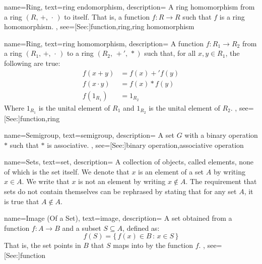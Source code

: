 {
    name={Ring},
    text={ring endomorphism},
    description={
        A ring homomorphism from a ring $(R,\,+,\,\cdot\,)$ to itself.
        That is, a function $f:R\rightarrow{R}$ such that $f$ is a
        ring homomorphism.
    },
    see=[See:]{function,ring,ring homomorphism}
}

{
    name={Ring},
    text={ring homomorphism},
    description={
        A function $f:R_{1}\rightarrow{R}_{2}$ from a ring
        $(R_{1},\,+,\,\cdot\,)$ to a ring $(R_{2},\,+',\,*)$ such that,
        for all $x,y\in{R}_{1}$, the following are true:
        {%
            \begin{align*}
                f(x+y)&=f(x)+'f(y)\\
                f(x\cdot{y})&=f(x)*f(y)\\
                f(1_{R_{1}})&=1_{R_{2}}
            \end{align*}
        }%
        Where $1_{R_{1}}$ is the unital element of $R_{1}$ and
        $1_{R_{2}}$ is the unital element of $R_{2}$.
    },
    see=[See:]{function,ring}
}

{
    name={Semigroup},
    text={semigroup},
    description={
        A set $G$ with a binary operation $*$ such that $*$ is associative.
    },
    see=[See:]{binary operation,associative operation}
}

{
    name={Sets},
    text={set},
    description={
        A collection of objects, called elements, none of which is the set
        itself. We denote that $x$ is an element of a set $A$ by writing
        $x\in{A}$. We write that $x$ is not an element by writing
        $x\notin{A}$. The requirement that sets do not contain themselves can
        be rephrased by stating that for any set $A$, it is true that
        $A\notin{A}$.
    }
}

{
    name={Image (Of a Set)},
    text={image},
    description={
        A set obtained from a function $f:A\rightarrow{B}$
        and a subset $S\subseteq{A}$, defined as:
        \begin{equation*}
            f(S)=\{\,f(x)\in{B}\,:\,x\in{S}\,\}
        \end{equation*}
        That is, the set points in $B$ that $S$ maps into by the function $f$.
    },
    see=[See:]{function}
}

